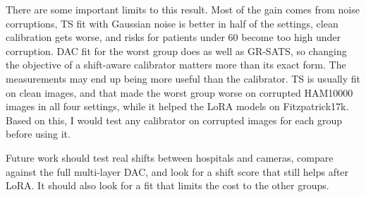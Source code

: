 \documentclass[sigconf,nonacm]{acmart}
\begin{document}
There are some important limits to this result. Most of the gain comes from noise corruptions, TS fit with Gaussian noise is better in half of the settings, clean calibration gets worse, and risks for patients under 60 become too high under corruption. DAC fit for the worst group does as well as GR-SATS, so changing the objective of a shift-aware calibrator matters more than its exact form. The measurements may end up being more useful than the calibrator. TS is usually fit on clean images, and that made the worst group worse on corrupted HAM10000 images in all four settings, while it helped the LoRA models on Fitzpatrick17k. Based on this, I would test any calibrator on corrupted images for each group before using it.

Future work should test real shifts between hospitals and cameras, compare against the full multi-layer DAC, and look for a shift score that still helps after LoRA. It should also look for a fit that limits the cost to the other groups.



\end{document}
